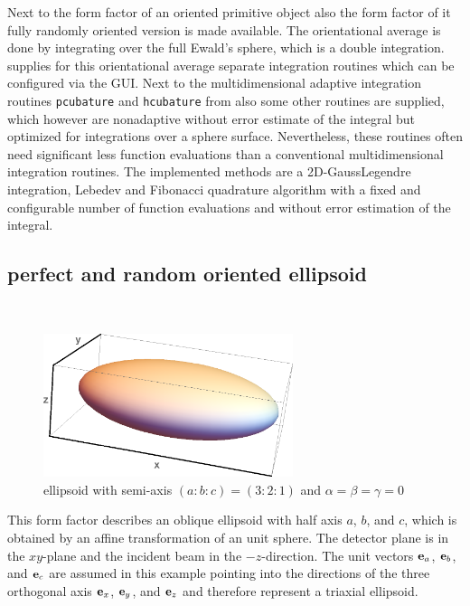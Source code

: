 Next to the form factor of an oriented primitive object also the form factor of it fully randomly oriented version is made available. The orientational average is done by integrating over the full Ewald's sphere, which is a double integration. \SASfit supplies for this orientational average separate integration routines which can be configured via the GUI. Next to the multidimensional adaptive integration routines \texttt{pcubature} and \texttt{hcubature} from \cite{Johnson} also some other routines are supplied, which however are nonadaptive without error estimate of the integral but optimized for integrations over a sphere surface. Nevertheless, these routines often need significant less function evaluations than a conventional multidimensional integration routines. The implemented methods are a 2D-GaussLegendre integration, Lebedev \cite{Lebedev1975,Lebedev1976,Lebedev1977} and Fibonacci \cite{Niederreiter1992,Marques2013} quadrature algorithm with a fixed and configurable number of function evaluations and without error estimation of the integral.

\subsection{perfect and random oriented ellipsoid} ~\\

\begin{figure}[htb]
\begin{center}
\includegraphics[width=0.65\textwidth]{../images/form_factor/supershapes/triaxial_ellipsoid321.png}
\end{center}
\caption{ellipsoid with semi-axis $(a:b:c)=(3:2:1)$ and $\alpha=\beta=\gamma=0$}
\label{fig:opo_ellipsoid}
\end{figure}

This form factor describes an oblique ellipsoid with half axis $a$, $b$, and $c$, which is obtained by an affine transformation of an unit sphere. The detector plane is in the $xy$-plane and the incident beam in the $-z$-direction. The unit vectors $\B{e}_a$, $\B{e}_b$, and $\B{e}_c$ are assumed in this example pointing into the directions of the three orthogonal axis $\B{e}_x$, $\B{e}_y$, and $\B{e}_z$ and therefore represent a triaxial ellipsoid.


